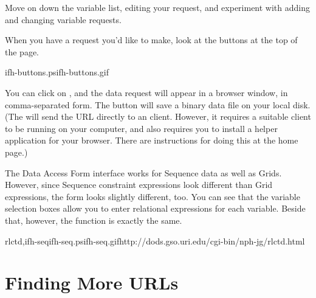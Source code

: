 \documentclass{dods-book}
\begin{document}
Move on down the variable list, editing your request, and experiment
with adding and changing variable requests.

When you have a request you'd like to make, look at the buttons at the
top of the page.  

{ifh-buttons.ps}{ifh-buttons.gif}{}

You can click on , and the data
request will appear in a browser window, in comma-separated form.  The
 button will save a binary data file on your local
disk.  (The  will send the URL directly to an \opendap
client.  However, it requires a suitable \opendap client to be running on
your computer, and also requires you to install a helper application
for your browser.  There are instructions for doing this at the \opendap
home page.)

The \opendap Data Access Form interface works for Sequence data as well as
Grids.  However, since Sequence constraint expressions look different
than Grid expressions, the form looks slightly different, too.  You
can see  that the
variable selection boxes allow you to enter relational expressions for
each variable.  Beside that, however, the function is exactly the same.

{rlctd,ifh-seq}{ifh-seq.ps}{ifh-seq.gif}{http://dods.gso.uri.edu/cgi-bin/nph-jg/rlctd.html}




\chapter{Finding More \opendap URLs}
\end{document}
